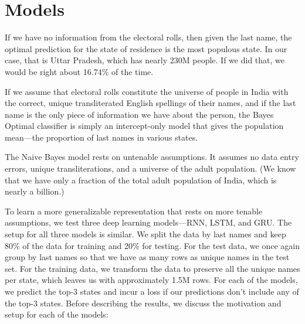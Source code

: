 \documentclass[11pt,  letterpaper]{article}
\begin{document}
\section{Models}

If we have no information from the electoral rolls, then given the last name, the optimal prediction for the state of residence is the most populous state. In our case, that is Uttar Pradesh, which has nearly 230M people. If we did that, we would be right about 16.74\% of the time.

If we assume that electoral rolls constitute the universe of people in India with the correct, unique transliterated English spellings of their names, and if the last name is the only piece of information we have about the person, the Bayes Optimal classifier is simply an intercept-only model that gives the population mean---the proportion of last names in various states. 

The Naive Bayes model rests on untenable assumptions. It assumes no data entry errors, unique transliterations, and a universe of the adult population. (We know that we have only a fraction of the total adult population of India, which is nearly a billion.) 


To learn a more generalizable representation that rests on more tenable assumptions, we test three deep learning models---RNN, LSTM, and GRU. The setup for all three models is similar. We split the data by last names and keep 80\% of the data for training and 20\% for testing. For the test data, we once again group by last names so that we have as many rows as unique names in the test set. For the training data, we transform the data to preserve all the unique names per state, which leaves us with approximately 1.5M rows. For each of the models, we predict the top-3 states and incur a loss if our predictions don't include any of the top-3 states. Before describing the results, we discuss the motivation and setup for each of the models:
\end{document}
